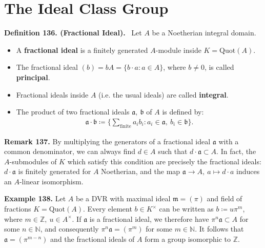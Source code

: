\documentclass[12pt,a4paper,footinclude=true,headinclude=true]{scrbook} %
\newenvironment{definition}[2][Definition]
    { \begin{mdframed}[backgroundcolor=gray!20] \textbf{#1 #2.}\ }
    {  \end{mdframed}}
\newenvironment{remark}[2][Remark]
    { \begin{mdframed}[backgroundcolor=gray!20] \textbf{#1 #2.} }
    {  \end{mdframed}}
\newenvironment{example}[2][Example]
    { \begin{mdframed}[backgroundcolor=gray!20] \textbf{#1 #2.} }
    {  \end{mdframed}}
\begin{document}
\section{The Ideal Class Group}
\begin{definition}{136. (Fractional Ideal)}
    Let $A$ be a Noetherian integral domain. 
    \begin{itemize}
        \item A \textbf{fractional ideal} is a finitely generated $A$-module inside $K=\mathrm{Quot}(A)$.
        \item The fractional ideal $(b)=bA=\{b\cdot a:a\in A\}$, where $b\neq0$, is called \textbf{principal}.
        \item Fractional ideals inside $A$ (i.e. the usual ideals) are called \textbf{integral}.
        \item The product of two fractional ideals $\mathfrak{a},\ \mathfrak{b}$ of $A$ is defined by:
        \begin{align*}
            \mathfrak{a}\cdot\mathfrak{b}\coloneqq\{\sum_{\text{finite}}a_ib_i: a_i\in\mathfrak{a},\ b_i\in\mathfrak{b}\}.
        \end{align*}
    \end{itemize}
\end{definition}

\begin{remark}{137}
    By multiplying the generators of a fractional ideal $\mathfrak{a}$ with a common denominator, we can always find $d\in A$ such that $d\cdot\mathfrak{a}\subset A$. In fact, the $A$-submodules of $K$ which satisfy this condition are precisely the fractional ideals: $d\cdot\mathfrak{a}$ is finitely generated for $A$ Noetherian, and the map $\mathfrak{a}\to A,\ a\mapsto d\cdot a$ induces an $A$-linear isomorphism.
\end{remark}

\begin{example}{138}
    Let $A$ be a DVR with maximal ideal $\mathfrak{m}=(\pi)$ and field of fractions $K=\mathrm{Quot}(A)$. Every element $b\in K^\times$ can be written as $b\coloneqq u\pi^m$, where $m\in\mathbb{Z},\ u\in A^\times$. If $\mathfrak{a}$ is a fractional ideal, we therefore have $\pi^n\mathfrak{a}\subset A$ for some $n\in\mathbb{N}$, and consequently $\pi^n\mathfrak{a} =(\pi^m)$ for some $m\in\mathbb{N}$. It follows that $\mathfrak{a}=(\pi^{m-n})$ and the fractional ideals of $A$ form a group isomorphic to $\mathbb{Z}$.
\end{example}
\end{document}
